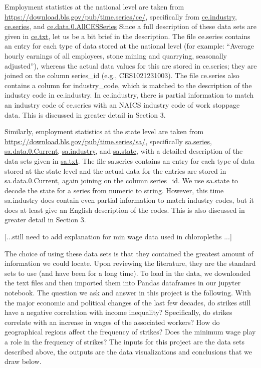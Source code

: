 \documentclass[reqno,11pt]{amsart}
\begin{document}
Employment statistics at the national level are taken from 
\url{https://download.bls.gov/pub/time.series/ce/},
specifically from 
\href{https://download.bls.gov/pub/time.series/ce/ce.industry}{ce.industry},
\href{https://download.bls.gov/pub/time.series/ce/ce.series}{ce.series},
and
\href{https://download.bls.gov/pub/time.series/ce/ce.data.0.AllCESSeries}{ce.data.0.AllCESSeries}
Since a full description of these data sets are given in 
\href{https://download.bls.gov/pub/time.series/ce/ce.txt}{ce.txt}, 
let us be a bit brief in the description. 
The file ce.series contains an entry for each type of data stored
at the national level (for example:
``Average hourly earnings of all employees, stone mining and quarrying, seasonally adjusted''),
whereas the actual data values for this are stored in 
ce.series; they are joined on the column series\_id (e.g., CES1021231003).
The file ce.series also contains a column for industry\_code, which is matched
to the description of the industry code in ce.industry. In ce.industry, there is
partial information to match an industry code of ce.series with an NAICS industry code of
work stoppage data. This is discussed in greater detail in Section 3.


Similarly, employment statistics at the state level are taken from 
\url{https://download.bls.gov/pub/time.series/sa/},
specifically
\href{https://download.bls.gov/pub/time.series/sa/sa.series}{sa.series},
\href{https://download.bls.gov/pub/time.series/sa/sa.data.0.Current}{sa.data.0.Current},
\href{https://download.bls.gov/pub/time.series/sa/sa.industry}{sa.industry},
and
\href{https://download.bls.gov/pub/time.series/sa/sa.state}{sa.state},
with a detailed description of the data sets given in
\href{https://download.bls.gov/pub/time.series/sa/sa.txt}{sa.txt}.
The file sa.series contains an entry for each type of data stored
at the state level and the actual data for the entries are stored in 
sa.data.0.Current, again joining on the column series\_id.
We use sa.state to decode the state for a series from numeric to string.
However, this time sa.industry does contain even partial information to 
match industry codes, but it does at least give an English description
of the codes. This is also discussed in greater detail in Section 3.


[...still need to add explanation for min wage data used in chloropleths ...]


The choice of using these data sets is that they contained the greatest
amount of information we could locate. Upon reviewing the literature,
they are the standard sets to use (and have been for a long time).
To load in the data, we downloaded the text files and then imported them
into Pandas dataframes in our jupyter notebook. The question we ask and
answer in this project is the following. With the major economic and political
changes of the last few decades, do strikes still have a negative correlation
with income inequality? Specifically, do strikes correlate with an increase
in wages of the associated workers? How do geographical regions affect
the frequency of strikes? Does the minimum wage play a role in the frequency
of strikes? The inputs for this project are the
data sets described above, the outputs are the data visualizations and 
conclusions that we draw below.
\end{document}
